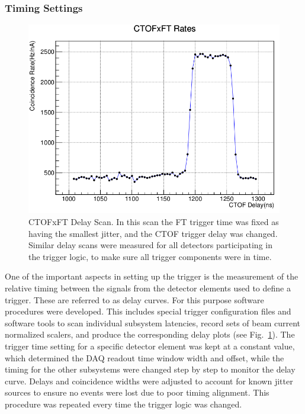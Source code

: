 \subsubsection{Timing Settings}

\begin{figure}[hbt]
	\centering
	\includegraphics[width=1.0\columnwidth,keepaspectratio]{img/delay_scan_ctof_ft.png}
	\caption{CTOFxFT Delay Scan. In this scan the FT trigger time was fixed as having the smallest jitter, and the CTOF trigger delay was changed. Similar delay scans were measured for all detectors participating in the trigger logic, to make sure all trigger components were in time.}
	\label{fig:delay_scan_ctof_ft}
\end{figure}

One of the important aspects in setting up the trigger is the measurement of the relative timing between the signals from the detector elements used to define a trigger. These are referred to as delay curves. For this purpose software procedures were developed. This includes special trigger configuration files and software tools to scan individual subsystem latencies, record sets of beam current normalized scalers, and produce the corresponding delay plots (see Fig.~\ref{fig:delay_scan_ctof_ft}). The trigger time setting for a specific detector element was kept at a constant value, which determined the DAQ readout time window width and offset, while the timing for the other subsystems were changed step by step to monitor the delay curve. Delays and coincidence widths were adjusted to account for known jitter sources to ensure no events were lost due to poor timing alignment. This procedure was repeated every time the trigger logic was changed.


